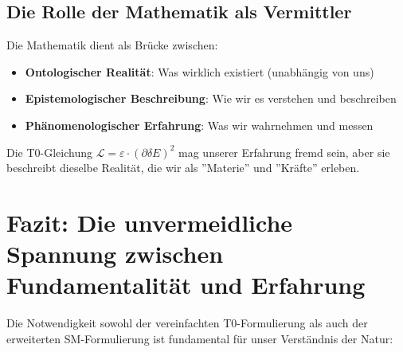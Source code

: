 \documentclass[12pt,a4paper]{article}
\begin{document}
	\subsection{Die Rolle der Mathematik als Vermittler}
	
	\begin{tcolorbox}[colback=purple!5!white,colframe=purple!75!black,title=Mathematik als universelle Sprache]
		Die Mathematik dient als Brücke zwischen:
		\begin{itemize}
			\item \textbf{Ontologischer Realität}: Was wirklich existiert (unabhängig von uns)
			\item \textbf{Epistemologischer Beschreibung}: Wie wir es verstehen und beschreiben
			\item \textbf{Phänomenologischer Erfahrung}: Was wir wahrnehmen und messen
		\end{itemize}
		
		Die T0-Gleichung $\mathcal{L} = \varepsilon \cdot (\partial\delta E)^2$ mag unserer Erfahrung fremd sein, aber sie beschreibt dieselbe Realität, die wir als ''Materie'' und ''Kräfte'' erleben.
	\end{tcolorbox}
	
	\section{Fazit: Die unvermeidliche Spannung zwischen Fundamentalität und Erfahrung}
	
	Die Notwendigkeit sowohl der vereinfachten T0-Formulierung als auch der erweiterten SM-Formulierung ist fundamental für unser Verständnis der Natur:
	
\end{document}
